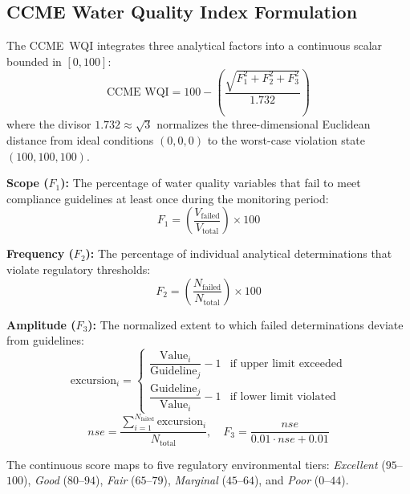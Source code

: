\documentclass[conference]{IEEEtran}
\begin{document}
\subsection{CCME Water Quality Index Formulation}
The CCME~WQI integrates three analytical factors into a continuous scalar bounded in $[0, 100]$:
\begin{equation}
  \text{CCME WQI} = 100 - \left(\frac{\sqrt{F_1^2 + F_2^2 + F_3^2}}{1.732}\right)
  \label{eq:ccme}
\end{equation}
where the divisor $1.732 \approx \sqrt{3}$ normalizes the three-dimensional Euclidean distance from ideal conditions $(0,0,0)$ to the worst-case violation state $(100,100,100)$.

\noindent\textbf{Scope ($F_1$):} The percentage of water quality variables that fail to meet compliance guidelines at least once during the monitoring period:
\begin{equation}
  F_1 = \left(\frac{V_{\text{failed}}}{V_{\text{total}}}\right) \times 100
\end{equation}

\noindent\textbf{Frequency ($F_2$):} The percentage of individual analytical determinations that violate regulatory thresholds:
\begin{equation}
  F_2 = \left(\frac{N_{\text{failed}}}{N_{\text{total}}}\right) \times 100
\end{equation}

\noindent\textbf{Amplitude ($F_3$):} The normalized extent to which failed determinations deviate from guidelines:
\begin{equation}
  \text{excursion}_i =
    \begin{cases}
      \dfrac{\text{Value}_i}{\text{Guideline}_j} - 1
        & \text{if upper limit exceeded}\\[6pt]
      \dfrac{\text{Guideline}_j}{\text{Value}_i} - 1
        & \text{if lower limit violated}
    \end{cases}
\end{equation}
\begin{equation}
  nse = \frac{\sum_{i=1}^{N_{\text{failed}}} \text{excursion}_i}{N_{\text{total}}}, \quad
  F_3 = \frac{nse}{0.01 \cdot nse + 0.01}
\end{equation}

The continuous score maps to five regulatory environmental tiers: \emph{Excellent} ($95$--$100$), \emph{Good} ($80$--$94$), \emph{Fair} ($65$--$79$), \emph{Marginal} ($45$--$64$), and \emph{Poor} ($0$--$44$).
\end{document}
